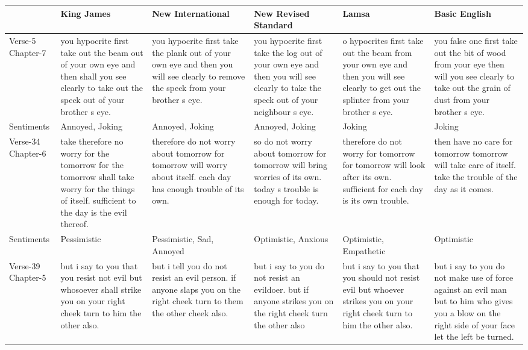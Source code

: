 \documentclass[5p,times]{elsarticle}
\begin{document}
\begin{table}[htbp!]
\footnotesize
\begin{center}
\begin{tabular}{p{}p{}p{}p{}p{}p{}} 
\hline
 \textbf{} &\textbf{King James} &  \textbf{New International} & \textbf{New Revised Standard}& \textbf{Lamsa}& \textbf{Basic English} \\ 
 \hline
Verse-5 Chapter-7&you hypocrite first take out the beam out of your own eye and then shall you see clearly to take out the speck out of your brother s eye.
&you hypocrite first take the plank out of your own eye and then you will see clearly to remove the speck from your brother s eye.
&you hypocrite first take the log out of your own eye and then you will see clearly to take the speck out of your neighbour s eye.
&o hypocrites first take out the beam from your own eye and then you will see clearly to get out the splinter from your brother s eye.
&you false one first take out the bit of wood from your eye then will you see clearly to take out the grain of dust from your brother s eye.

\\  \hline
Sentiments&Annoyed, Joking&Annoyed, Joking&Annoyed, Joking&Joking&Joking
\\  \hline

 Verse-34 Chapter-6&take therefore no worry for the tomorrow for the tomorrow shall take worry for the things of itself. sufficient to the day is the evil thereof.
&therefore do not worry about tomorrow for tomorrow will worry about itself. each day has enough trouble of its own.
&so do not worry about tomorrow for tomorrow will bring worries of its own. today s trouble is enough for today.
&therefore do not worry for tomorrow for tomorrow will look after its own. sufficient for each day is its own trouble.
&then have no care for tomorrow tomorrow will take care of itself. take the trouble of the day as it comes.


\\  \hline
Sentiments&Pessimistic&Pessimistic, Sad, Annoyed&Optimistic, Anxious&Optimistic, Empathetic&Optimistic\\  \hline

 Verse-39 Chapter-5&but i say to you that you resist not evil but whosoever shall strike you on your right cheek turn to him the other also.
&but i tell you do not resist an evil person. if anyone slaps you on the right cheek turn to them the other cheek also.
&but i say to you do not resist an evildoer. but if anyone strikes you on the right cheek turn the other also
&but i say to you that you should not resist evil but whoever strikes you on your right cheek turn to him the other also.
&but i say to you do not make use of force against an evil man but to him who gives you a blow on the right side of your face let the left be turned.



\end{tabular}
\end{center}
\end{table}
\end{document}
